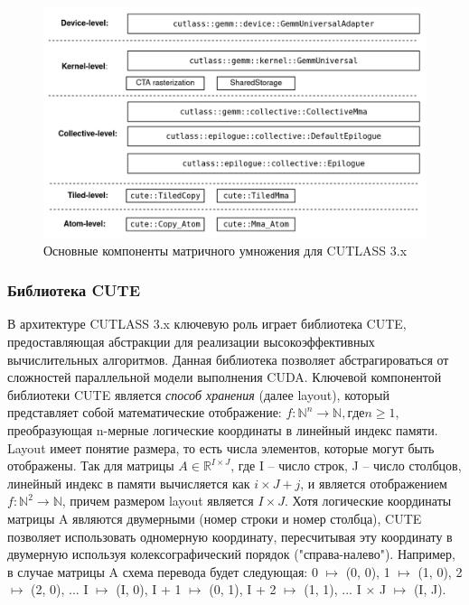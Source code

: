 \begin{figure}
    \centering
    \includegraphics[scale=0.5]{src/images/cutlass-gemm3-components.png}
    \caption{Основные компоненты матричного умножения для CUTLASS 3.x}
    \label{fig:cutlass_gemm_3.x}
\end{figure}

\subsubsection{Библиотека CUTE}
В архитектуре CUTLASS 3.x ключевую роль играет библиотека CUTE, предоставляющая абстракции для реализации высокоэффективных
вычислительных алгоритмов. Данная библиотека позволяет абстрагироваться от сложностей параллельной модели выполнения CUDA.
Ключевой компонентой библиотеки CUTE является \textit{способ хранения} (далее layout), который представляет собой математические отображение:
$f \colon \mathbb{N}^n \to \mathbb{N}, где n \geq 1$, преобразующая n-мерные логические координаты в линейный индекс памяти.
Layout имеет понятие размера, то есть числа элементов, которые могут быть отображены.  Так для матрицы $A \in \mathbb{R}^{I \times J}$,
где I -- число строк, J -- число столбцов, линейный индекс в памяти вычисляется как $i \times J + j$, и является
отображением $f \colon \mathbb{N}^2 \to \mathbb{N}$, причем размером layout является $I \times J$.
Хотя логические координаты матрицы A являются двумерными (номер строки и номер столбца), CUTE позволяет использовать одномерную координату,
пересчитывая эту координату в двумерную используя колексографический порядок ("справа-налево").
Например, в случае матрицы A схема перевода будет следующая: 0 $\mapsto$ (0, 0), 1 $\mapsto$ (1, 0), 2 $\mapsto$ (2, 0), ... I $\mapsto$ (I, 0),
I + 1 $\mapsto$ (0, 1), I + 2 $\mapsto$ (1, 1), ... I $\times$ J $\mapsto$ (I, J).

